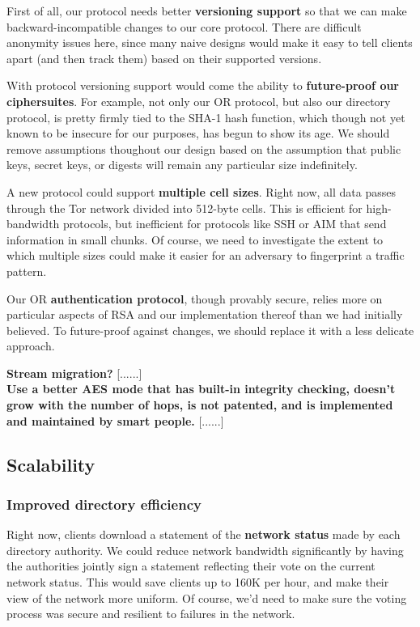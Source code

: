 \documentclass{article}
\newcommand{\tmp}[1]{{\bf #1} [......] \\}
\begin{document}
First of all, our protocol needs better {\bf versioning support} so that we
can make backward-incompatible changes to our core protocol.  There are
difficult anonymity issues here, since many naive designs would make it easy
to tell clients apart (and then track them) based on their supported versions.

With protocol versioning support would come the ability to {\bf future-proof
  our ciphersuites}.  For example, not only our OR protocol, but also our
directory protocol, is pretty firmly tied to the SHA-1 hash function, which
though not yet known to be insecure for our purposes, has begun to show
its age.  We should
remove assumptions thoughout our design based on the assumption that public
keys, secret keys, or digests will remain any particular size indefinitely.

A new protocol could support {\bf multiple cell sizes}.  Right now, all data
passes through the Tor network divided into 512-byte cells.  This is
efficient for high-bandwidth protocols, but inefficient for protocols
like SSH or AIM that send information in small chunks.  Of course, we need to
investigate the extent to which multiple sizes could make it easier for an
adversary to fingerprint a traffic pattern.

Our OR {\bf authentication protocol}, though provably
secure\cite{tap:pet2006}, relies more on particular aspects of RSA and our
implementation thereof than we had initially believed.  To future-proof
against changes, we should replace it with a less delicate approach.

\tmp{Stream migration?}

\tmp{Use a better AES mode that has built-in integrity checking,
doesn't grow with the number of hops, is not patented, and
is implemented and maintained by smart people.}

\subsection{Scalability}

\subsubsection{Improved directory efficiency}
Right now, clients download a statement of the {\bf network status} made by
each directory authority.  We could reduce network bandwidth significantly by
having the authorities jointly sign a statement reflecting their vote on the
current network status.  This would save clients up to 160K per hour, and
make their view of the network more uniform.  Of course, we'd need to make
sure the voting process was secure and resilient to failures in the network.
\end{document}
